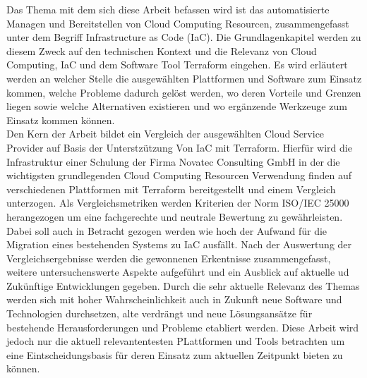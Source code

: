 \begin{spacing}{1.2}
Das Thema mit dem sich diese Arbeit befassen wird ist das automatisierte
Managen und Bereitstellen von Cloud Computing Resourcen,
zusammengefasst unter dem Begriff Infrastructure as Code (IaC). Die Grundlagenkapitel werden zu diesem Zweck auf
den technischen Kontext und die Relevanz von Cloud Computing, IaC und
dem Software Tool Terraform eingehen.
Es wird erläutert werden an welcher Stelle die ausgewählten Plattformen
und Software zum Einsatz kommen, welche Probleme dadurch gelöst werden,
wo deren Vorteile und Grenzen liegen sowie welche Alternativen existieren
und wo ergänzende Werkzeuge zum Einsatz kommen können.\\
Den Kern der Arbeit bildet ein Vergleich der ausgewählten Cloud
Service Provider auf Basis der Unterstzützung Von IaC mit Terraform.
Hierfür wird die Infrastruktur einer Schulung der Firma Novatec
Consulting GmbH in der die wichtigsten grundlegenden Cloud Computing
Resourcen Verwendung finden auf verschiedenen Plattformen mit Terraform
bereitgestellt und einem Vergleich unterzogen.
Als Vergleichsmetriken werden Kriterien der Norm ISO/IEC 25000
herangezogen um eine fachgerechte und neutrale Bewertung zu gewährleisten.
Dabei soll auch in Betracht gezogen werden wie hoch der Aufwand für die
Migration eines bestehenden Systems zu IaC ausfällt.
Nach der Auswertung der Vergleichsergebnisse werden die gewonnenen
Erkentnisse zusammengefasst, weitere untersuchenswerte Aspekte aufgeführt
und ein Ausblick auf aktuelle ud Zukünftige Entwicklungen gegeben. Durch
die sehr aktuelle Relevanz des Themas werden sich mit hoher
Wahrscheinlichkeit auch
in Zukunft neue Software und Technologien durchsetzen, alte verdrängt und
neue Lösungsansätze für bestehende Herausforderungen und Probleme
etabliert werden. Diese Arbeit wird jedoch nur die aktuell relevantentesten
PLattformen und Tools betrachten um eine Eintscheidungsbasis für deren
Einsatz zum aktuellen Zeitpunkt bieten zu können.

\end{spacing}